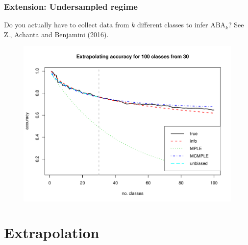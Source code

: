 \documentclass{beamer}
\begin{document}
\begin{frame}
\frametitle{Extension: Undersampled regime}
Do you actually have to collect data from $k$ different classes to infer $\text{ABA}_k$?
See Z., Achanta and Benjamini (2016).
\begin{figure}
\centering
\includegraphics[scale = 0.4]{../info_theory_paper/cifar_example.pdf}
\end{figure}
\end{frame}

\section{Extrapolation}

\sectionpage
\end{document}
